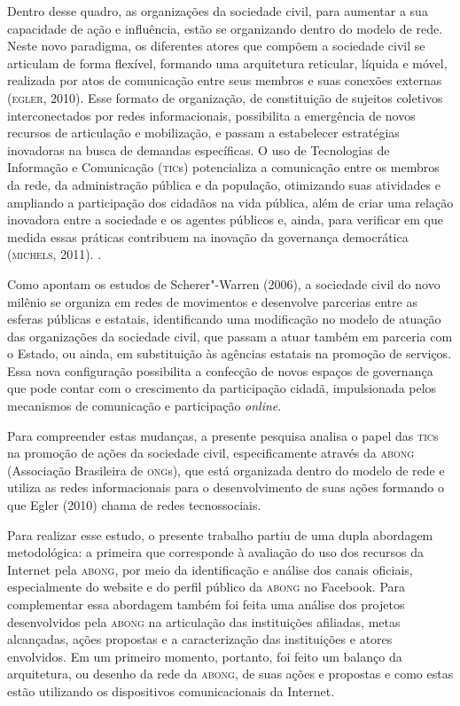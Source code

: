 Dentro desse quadro, as organizações da sociedade civil, para aumentar a
sua capacidade de ação e influência, estão se organizando dentro do
modelo de rede. Neste novo paradigma, os diferentes atores que compõem a
sociedade civil se articulam de forma flexível, formando uma arquitetura
reticular, líquida e móvel, realizada por atos de comunicação entre seus
membros e suas conexões externas (\textsc{egler}, 2010). Esse formato de
organização, de constituição de sujeitos coletivos interconectados por
redes informacionais, possibilita a emergência de novos recursos de
articulação e mobilização, e passam a estabelecer estratégias inovadoras
na busca de demandas específicas. O uso de Tecnologias de Informação e
Comunicação (\textsc{tic}s) potencializa a comunicação entre os membros da rede,
da administração pública e da população, otimizando suas atividades e
ampliando a participação dos cidadãos na vida pública, além de criar uma
relação inovadora entre a sociedade e os agentes públicos e, ainda, para
verificar em que medida essas práticas contribuem na inovação da
governança democrática (\textsc{michels}, 2011). .

Como apontam os estudos de Scherer"-Warren (2006), a sociedade civil do
novo milênio se organiza em redes de movimentos e desenvolve parcerias
entre as esferas públicas e estatais, identificando uma modificação no
modelo de atuação das organizações da sociedade civil, que passam a
atuar também em parceria com o Estado, ou ainda, em substituição às
agências estatais na promoção de serviços. Essa nova configuração
possibilita a confecção de novos espaços de governança que pode contar
com o crescimento da participação cidadã, impulsionada pelos mecanismos
de comunicação e participação \emph{online}.

Para compreender estas mudanças, a presente pesquisa analisa o papel das
\textsc{tic}s na promoção de ações da sociedade civil, especificamente através da
\textsc{abong} (Associação Brasileira de \textsc{ong}s), que está organizada dentro do
modelo de rede e utiliza as redes informacionais para o desenvolvimento
de suas ações formando o que Egler (2010) chama de redes tecnossociais.

Para realizar esse estudo, o presente trabalho partiu de uma dupla
abordagem metodológica: a primeira que corresponde à avaliação do uso
dos recursos da Internet pela \textsc{abong}, por meio da identificação e análise
dos canais oficiais, especialmente do website e do perfil público da
\textsc{abong} no Facebook. Para complementar essa abordagem também foi feita uma
análise dos projetos desenvolvidos pela \textsc{abong} na articulação das
instituições afiliadas, metas alcançadas, ações propostas e a
caracterização das instituições e atores envolvidos. Em um primeiro
momento, portanto, foi feito um balanço da arquitetura, ou desenho da
rede da \textsc{abong}, de suas ações e propostas e como estas estão utilizando
os dispositivos comunicacionais da Internet.

